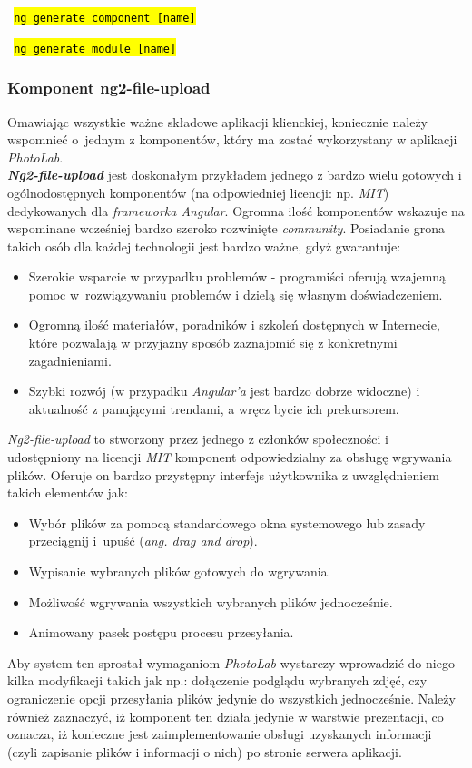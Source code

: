 \vspace{2mm}

    \centerline{\texttt{\hl{ ng generate component [name] }}}
    \centerline{\texttt{\hl{ ng generate module [name] }}}

\vspace{2mm}


	\subsubsection{Komponent ng2-file-upload}
	\quad Omawiając wszystkie ważne składowe aplikacji klienckiej, koniecznie należy wspomnieć o~jednym z komponentów, który ma zostać wykorzystany w aplikacji \textit{PhotoLab}.\\
	\textbf{\textit{Ng2-file-upload}} jest doskonałym przykładem jednego z bardzo wielu gotowych i ogólnodostępnych komponentów (na odpowiedniej licencji: np. \textit{MIT}) dedykowanych dla \textit{frameworka Angular}. Ogromna ilość komponentów wskazuje na wspominane wcześniej bardzo szeroko rozwinięte \textit{community}. Posiadanie grona takich osób dla każdej technologii jest bardzo ważne, gdyż gwarantuje: 
	\begin{itemize}
	    \item Szerokie wsparcie w przypadku problemów - programiści oferują wzajemną pomoc w~rozwiązywaniu problemów i dzielą się własnym doświadczeniem.
	    \item Ogromną ilość materiałów, poradników i szkoleń dostępnych w Internecie, które pozwalają w przyjazny sposób zaznajomić się z konkretnymi zagadnieniami.
	    \item Szybki rozwój (w przypadku \textit{Angular'a} jest bardzo dobrze widoczne) i aktualność z panującymi trendami, a wręcz bycie ich prekursorem.
	\end{itemize}
	\textit{Ng2-file-upload} to stworzony przez jednego z członków społeczności i udostępniony na licencji \textit{MIT} komponent odpowiedzialny za obsługę wgrywania plików. Oferuje on bardzo przystępny interfejs użytkownika z uwzględnieniem takich elementów jak:
	\begin{itemize}
	    \item Wybór plików za pomocą standardowego okna systemowego lub zasady przeciągnij i~upuść (\textit{ang. drag and drop}).
	    \item Wypisanie wybranych plików gotowych do wgrywania.
	    \item Możliwość wgrywania wszystkich wybranych plików jednocześnie.
	    \item Animowany pasek postępu procesu przesyłania.
	\end{itemize}
	Aby system ten sprostał wymaganiom \textit{PhotoLab} wystarczy wprowadzić do niego kilka modyfikacji takich jak np.: dołączenie podglądu wybranych zdjęć, czy ograniczenie opcji przesyłania plików jedynie do wszystkich jednocześnie. Należy również zaznaczyć, iż komponent ten działa jedynie w warstwie prezentacji, co oznacza, iż konieczne jest zaimplementowanie obsługi uzyskanych informacji (czyli zapisanie plików i informacji o nich) po stronie serwera aplikacji.

